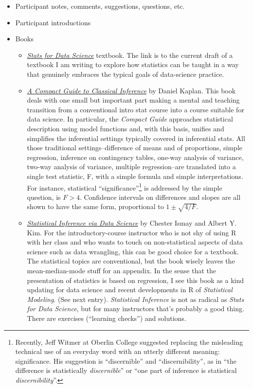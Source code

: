 \documentclass[]{book}
\providecommand{\tightlist}{%
  \setlength{\itemsep}{0pt}\setlength{\parskip}{0pt}}
\let\rmarkdownfootnote\footnote%
\def\footnote{\protect\rmarkdownfootnote}
\begin{document}
\begin{itemize}
\tightlist
\item
  Participant notes, comments, suggestions, questions, etc.
\item
  Participant introductions
\item
  Books

  \begin{itemize}
  \tightlist
  \item
    \href{http://dtkaplan.github.io/SDS-book}{\emph{Stats for Data Science}} textbook. The link is to the current draft of a textbook I am writing to explore how statistics can be taught in a way that genuinely embraces the typical goals of data-science practice.
  \item
    \emph{\href{http://dtkaplan/github.io/CompactInference/private}{A Compact Guide to Classical Inference}} by Daniel Kaplan. This book deals with one small but important part making a mental and teaching transition from a conventional intro stat course into a course suitable for data science. In particular, the \emph{Compact Guide} approaches statistical description using model functions and, with this basis, unifies and simplifies the inferential settings typically covered in inferential stats. All those traditional settings--difference of means and of proportions, simple regression, inference on contingency tables, one-way analysis of variance, two-way analysis of variance, multiple regression--are translated into a single test statistic, F, with a simple formula and simple interpretations. For instance, statistical ``significance''\footnote{Recently, Jeff Witmer at Oberlin College suggested replacing the misleading technical use of an everyday word with an utterly different meaning: significance. His suggestion is ``discernible'' and ``discernibility'', as in ``the difference is statistically \emph{discernible}'' or ``one part of inference is statistical \emph{discernibility}''.} is addressed by the simple question, is \(F > 4\). Confidence intervals on differences and slopes are all shown to have the same form, proportional to \(1 \pm \sqrt{4 / F}\).
  \item
    \emph{\href{http://moderndive.com/}{Statistical Inference via Data Science}} by Chester Ismay and Albert Y. Kim. For the introductory-course instructor who is not shy of using R with her class and who wants to touch on non-statistical aspects of data science such as data wrangling, this can be good choice for a textbook. The statistical topics are conventional, but the book wisely leaves the mean-median-mode stuff for an appendix. In the sense that the presentation of statistics is based on regression, I see this book as a kind updating for data science and recent developments in R of \emph{Statistical Modeling}. (See next entry). \emph{Statistical Inference} is not as radical as \emph{Stats for Data Science}, but for many instructors that's probably a good thing. There are exercises (``learning checks'') and solutions.

\end{itemize}
\end{itemize}
\end{document}
